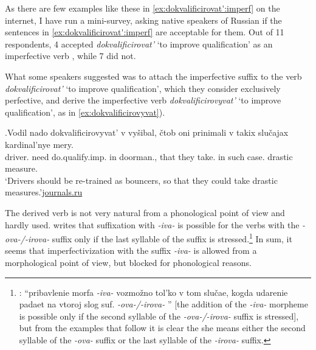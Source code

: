 As there are few examples like these in \ref{ex:dokvalificirovat':imperf} on the internet, I have run a mini-survey, asking native speakers of Russian if the sentences in \ref{ex:dokvalificirovat':imperf} are acceptable for them. Out of 11 respondents, 4 accepted \textit{dokvalificirovat'} `to improve qualification' as an imperfective verb , while 7 did not.

What some speakers suggested was to attach the imperfective suffix   to the verb \textit{dokvalificirovat'} `to improve qualification', which they consider exclusively perfective, and derive the imperfective verb  \textit{dokvalificirovyvat'} `to improve qualification', as in \ref{ex:dokvalificirovyvat}). 

\exg.\label{ex:dokvalificirovyvat}Vodil nado dokvalificirovyvat' v vy\v{s}ibal, \v{c}tob oni prinimali v takix slu\v{c}ajax kardinal'nye mery.\\
driver. need do.qualify.imp. in doorman., that they take. in such case. drastic measure.\\
\trans `Drivers should be re-trained as bouncers, so that they could take drastic measures.'\hbox{}\hfill\hbox{\url{journals.ru}}

The derived verb is not very natural from a phonological point of view and hardly used. \citet[590]{Shvedova:82} writes that suffixation   with \textit{-iva-} is possible for the verbs with the \textit{-ova-/-irova-}   suffix only if the last syllable of the suffix is stressed.\footnote{\citet[590]{Shvedova:82}: ``pribavlenie morfa \textit{-­iva-} vozmo\v{z}no tol'ko v tom slu\v{c}ae, kogda udarenie padaet na vtoroj slog suf. \textit{-­ova-/-irova-}  '' [the addition of the \textit{-iva-} morpheme is possible only if the second syllable of the \textit{-­ova-/-irova-}   suffix is stressed], but from the examples that follow it is clear the she means either the second syllable of the \textit{-ova-}   suffix or the last syllable of the \textit{-irova-}   suffix.} In sum, it seems that imperfectivization  with the suffix \textit{-iva-} is allowed from a morphological point of view, but blocked for phonological reasons.
 
